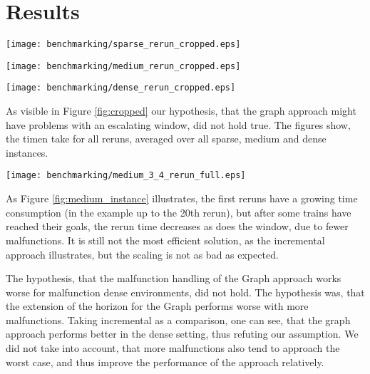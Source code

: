\newpage
\section{Results}
\begin{figure*}[h]
    \begin{minipage}[t]{0.32\textwidth}
        \texttt{[image: benchmarking/sparse\_rerun\_cropped.eps]}
    \end{minipage}
    \begin{minipage}[t]{0.34\textwidth}
        \texttt{[image: benchmarking/medium\_rerun\_cropped.eps]}
    \end{minipage}
    \begin{minipage}[t]{0.32\textwidth}
        \texttt{[image: benchmarking/dense\_rerun\_cropped.eps]}
    \end{minipage}
    \caption{Time cost over rerun (from left to right sparse, medium, dense)}
    \label{fig:cropped}
\end{figure*}

As visible in Figure \ref{fig:cropped} our hypothesis, that the graph approach might have problems with an escalating window, did not hold true. The figures show, the timen take for all reruns, averaged over all sparse, medium and dense instances.

\begin{figure*}[h]
	\texttt{[image: benchmarking/medium\_3\_4\_rerun\_full.eps]}
	\caption{A singular medium Instance with 3\% Malfunction}
	\label{fig:medium_instance}
\end{figure*}


As Figure \ref{fig:medium_instance} illustrates, the first reruns have a growing time consumption (in the example up to the 20th rerun), but after some trains have reached their goals, the rerun time decreases as does the window, due to fewer malfunctions. It is still not the most efficient solution, as the incremental approach illustrates, but the scaling is not as bad as expected.

The hypothesis, that the malfunction handling of the Graph approach works worse for malfunction dense environments, did not hold. The hypothesis was, that the extension of the horizon for the Graph performs worse with more malfunctions. Taking incremental as a comparison, one can see, that the graph approach performs better in the dense setting, thus refuting our assumption. We did not take into account, that more malfunctions also tend to approach the worst case, and thus improve the performance of the approach relatively.

